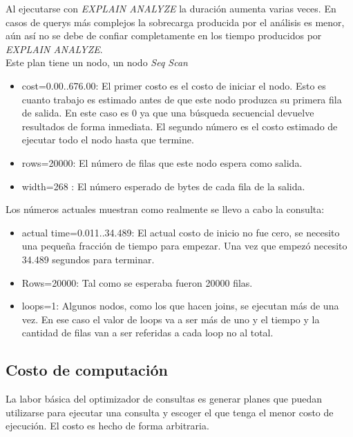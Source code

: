 Al ejecutarse con \textit{EXPLAIN ANALYZE} la duración aumenta varias veces. En casos de querys más complejos la sobrecarga producida por el análisis es menor, aún así no se debe de confiar completamente en los tiempo producidos por \textit{EXPLAIN ANALYZE}.\\

Este plan tiene un nodo, un nodo \textit{Seq Scan}

\begin{itemize}
\item cost=0.00..676.00: El primer costo es el costo de iniciar el nodo. Esto es cuanto trabajo es estimado antes de que este nodo produzca su primera fila de salida. En este caso es 0 ya que una búsqueda secuencial devuelve resultados de forma inmediata. El segundo número es el costo estimado de ejecutar todo el nodo hasta que termine.
\item rows=20000:  El número de filas que este nodo espera como salida.
\item width=268 : El número esperado de bytes de cada fila de la salida. 
\end{itemize}

Los números actuales muestran como realmente se llevo a cabo la consulta:
\begin{itemize}
\item actual time=0.011..34.489: El actual costo de inicio no fue cero, se necesito una pequeña fracción de tiempo para empezar. Una vez que empezó necesito 34.489 segundos para terminar.
\item Rows=20000: Tal como se esperaba fueron 20000 filas.
\item loops=1: Algunos nodos, como los que hacen joins, se ejecutan más de una vez. En ese caso el valor de loops va a ser más de uno y el tiempo y la cantidad de filas van a ser referidas a cada loop no al total.
\end{itemize}

\subsection{Costo de computación}

La labor básica del optimizador de consultas es generar planes que puedan utilizarse para ejecutar una consulta y escoger el que tenga el menor costo de ejecución. El costo es hecho de forma arbitraria.

